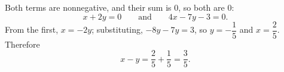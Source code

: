 Both terms are nonnegative, and their sum is $0$, so both are $0$:
\[
x+2y=0\qquad\text{and}\qquad 4x-7y-3=0 .
\]
From the first, $x=-2y$; substituting, $-8y-7y=3$, so $y=-\dfrac{1}{5}$ and $x=\dfrac{2}{5}$. Therefore
\[
x-y=\dfrac{2}{5}+\dfrac{1}{5}=\boxed{\dfrac{3}{5}}.
\]
